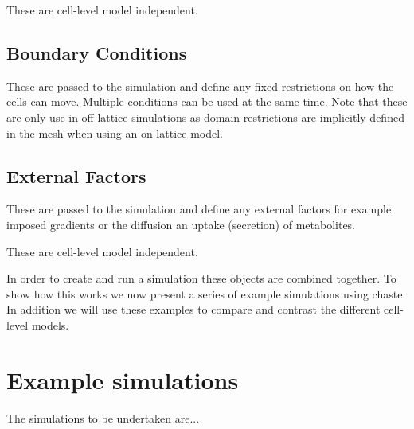 \documentclass{siamltex}
\begin{document}
These are cell-level model independent.


\subsection{Boundary Conditions} \label{sec:structure:bcs}
These are passed to the simulation and define any fixed restrictions on how the cells can move. 
Multiple conditions can be used at the same time.
Note that these are only use in off-lattice simulations as domain restrictions are implicitly defined in the mesh when using an on-lattice model.


\subsection{External Factors} \label{sec:structure:external}
These are passed to the simulation and define any external factors for example imposed gradients or the diffusion an uptake (secretion) of metabolites.

These are cell-level model independent.



In order to create and run a simulation these objects are combined together. To show how this works we now present a series of example simulations using chaste. In addition we will use these examples to compare and contrast the different cell-level models.


\section{Example simulations} \label{sec:example_simulations}

The simulations to be undertaken are...
\end{document}
